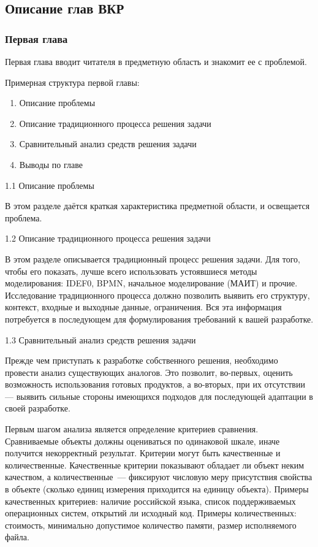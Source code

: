 \subsection{Описание глав ВКР}



\subsubsection{Первая глава}

Первая глава вводит читателя в предметную область и знакомит ее с проблемой.

Примерная структура первой главы:
\begin{enumerate} [
	label=1.\arabic*.]
	\item Описание проблемы
	\item Описание традиционного процесса решения задачи
	\item Сравнительный анализ средств решения задачи
	\item Выводы по главе		
\end{enumerate}

1.1 Описание проблемы

В этом разделе даётся краткая характеристика предметной области, и освещается проблема.


1.2 Описание традиционного процесса решения задачи

В этом разделе описывается традиционный процесс решения задачи. Для того, чтобы его показать, лучше всего использовать устоявшиеся  методы моделирования: IDEF0, BPMN, начальное моделирование (МАИТ) и прочие. Исследование традиционного процесса должно позволить выявить его структуру, контекст, входные и выходные данные, ограничения. Вся эта информация потребуется в последующем для формулирования требований к вашей разработке. 


1.3 Сравнительный анализ средств решения задачи

Прежде чем приступать к разработке собственного решения, необходимо провести анализ существующих аналогов. Это позволит, во-первых, оценить возможность использования готовых продуктов, а во-вторых, при их отсутствии — выявить сильные стороны имеющихся подходов для последующей адаптации в своей разработке.

Первым шагом анализа является определение критериев сравнения. Сравниваемые объекты должны оцениваться по одинаковой шкале, иначе получится некорректный результат. Критерии могут быть качественные и количественные. Качественные критерии  показывают обладает ли объект неким качеством, а количественные~--- фиксируют числовую меру присутствия свойства в объекте (сколько единиц измерения приходится на единицу объекта). Примеры качественных критериев: наличие российской языка, список поддерживаемых операционных систем, открытий ли исходный код. Примеры количественных: стоимость, минимально допустимое количество памяти, размер исполняемого файла.   

